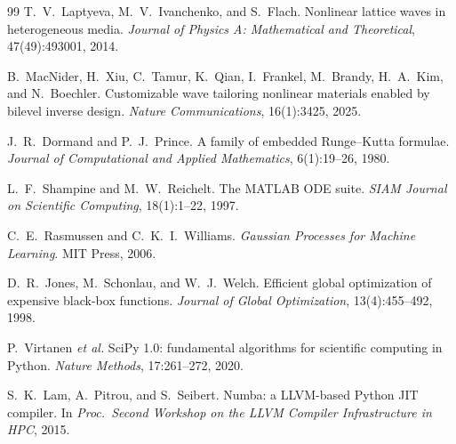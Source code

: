 \documentclass[12pt,letterpaper]{article}
\begin{document}
\begin{thebibliography}{99}
T.~V.~Laptyeva, M.~V.~Ivanchenko, and S.~Flach.
Nonlinear lattice waves in heterogeneous media.
\emph{Journal of Physics A: Mathematical and Theoretical}, 47(49):493001, 2014.

B.~MacNider, H.~Xiu, C.~Tamur, K.~Qian, I.~Frankel, M.~Brandy, H.~A.~Kim, and
N.~Boechler.
Customizable wave tailoring nonlinear materials enabled by bilevel inverse design.
\emph{Nature Communications}, 16(1):3425, 2025.

J.~R.~Dormand and P.~J.~Prince.
A family of embedded Runge--Kutta formulae.
\emph{Journal of Computational and Applied Mathematics}, 6(1):19--26, 1980.

L.~F.~Shampine and M.~W.~Reichelt.
The MATLAB ODE suite.
\emph{SIAM Journal on Scientific Computing}, 18(1):1--22, 1997.

C.~E.~Rasmussen and C.~K.~I.~Williams.
\emph{Gaussian Processes for Machine Learning}.
MIT Press, 2006.

D.~R.~Jones, M.~Schonlau, and W.~J.~Welch.
Efficient global optimization of expensive black-box functions.
\emph{Journal of Global Optimization}, 13(4):455--492, 1998.

P.~Virtanen \emph{et al.}
SciPy 1.0: fundamental algorithms for scientific computing in Python.
\emph{Nature Methods}, 17:261--272, 2020.

S.~K.~Lam, A.~Pitrou, and S.~Seibert.
Numba: a LLVM-based Python JIT compiler.
In \emph{Proc.\ Second Workshop on the LLVM Compiler Infrastructure in HPC}, 2015.

\end{thebibliography}
\end{document}
